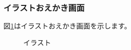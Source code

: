 \documentclass[a4j]{jarticle}
\begin{document}
\newpage
\subsubsection{イラストおえかき画面}
図\ref{illustration}はイラストおえかき画面を示します。\\

\begin{figure}[H]
  \begin{minipage}{0.5\hsize}
    \begin{center}
    \caption {イラスト}
    \label{illustration}
    \end{center}
  \end{minipage}
  \begin{minipage}{0.5\hsize}
    \begin{center}

\end{center}
\end{minipage}
\end{figure}
\end{document}
